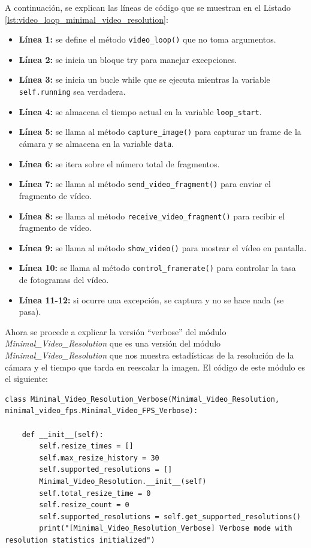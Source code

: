 A continuación, se explican las líneas de código que se muestran en el Listado \ref{lst:video_loop_minimal_video_resolution}:
\begin{itemize}
    \item \textbf{Línea 1:} se define el método \texttt{video\_loop()} que no toma argumentos.
    \item \textbf{Línea 2:} se inicia un bloque try para manejar excepciones.
    \item \textbf{Línea 3:} se inicia un bucle while que se ejecuta mientras la variable \texttt{self.running} sea verdadera.
    \item \textbf{Línea 4:} se almacena el tiempo actual en la variable \texttt{loop\_start}.
    \item \textbf{Línea 5:} se llama al método \texttt{capture\_image()} para capturar un frame de la cámara y se almacena en la variable \texttt{data}.
    \item \textbf{Línea 6:} se itera sobre el número total de fragmentos.
    \item \textbf{Línea 7:} se llama al método \texttt{send\_video\_fragment()} para enviar el fragmento de vídeo.
    \item \textbf{Línea 8:} se llama al método \texttt{receive\_video\_fragment()} para recibir el fragmento de vídeo.
    \item \textbf{Línea 9:} se llama al método \texttt{show\_video()} para mostrar el vídeo en pantalla.
    \item \textbf{Línea 10:} se llama al método \texttt{control\_framerate()} para controlar la tasa de fotogramas del vídeo.
    \item \textbf{Línea 11-12:} si ocurre una excepción, se captura y no se hace nada (se pasa).
\end{itemize}
\vspace{\baselineskip}

Ahora se procede a explicar la versión ``verbose'' del módulo \textit{Minimal\_Video\_Resolution} que es una versión del módulo \textit{Minimal\_Video\_Resolution} que nos muestra estadísticas de la resolución de la cámara y el tiempo que tarda en reescalar la imagen. El código de este módulo es el siguiente:
\begin{lstlisting}[style=pythonstyle, caption={Comienzo del módulo \textit{Minimal\_Video\_Resolution\_verbose} y su inicialización.}, label={lst:comienzo_minimal_video_resolution_verbose}]
class Minimal_Video_Resolution_Verbose(Minimal_Video_Resolution, minimal_video_fps.Minimal_Video_FPS_Verbose):
    
    def __init__(self):
        self.resize_times = []
        self.max_resize_history = 30
        self.supported_resolutions = []
        Minimal_Video_Resolution.__init__(self)
        self.total_resize_time = 0
        self.resize_count = 0
        self.supported_resolutions = self.get_supported_resolutions()
        print("[Minimal_Video_Resolution_Verbose] Verbose mode with resolution statistics initialized")
\end{lstlisting}
\vspace{\baselineskip}

